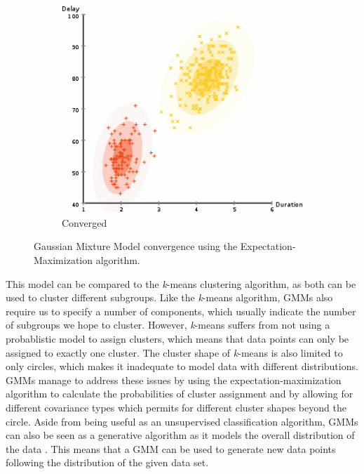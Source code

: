 \documentclass
[
    a4paper,
    twoside,
    12pt,
]
{report}
\begin{document}
\begin{figure}[ht!]
\begin{subfigure}[H]{0.3\textwidth}
         \label{fig:gmm-mid}
   \end{subfigure}
   \quad
   \begin{subfigure}[H]{0.3\textwidth}
      \includegraphics[width=\textwidth]{img/em-alg4.jpg}
         \caption{Converged}
         \label{fig:gmm-conv}
   \end{subfigure}
   \quad
   \caption{Gaussian Mixture Model convergence using the Expectation-Maximization algorithm.}\label{fig:em-converge}
\end{figure}

This model can be compared to the \emph{k}-means clustering algorithm,
as both can be used to cluster different subgroups. Like the
\emph{k}-means algorithm, GMMs also require us to specify a number of
components, which usually indicate the number of subgroups we hope to
cluster. However, \emph{k}-means suffers from not using a probablistic
model to assign clusters, which means that data points can only be
assigned to exactly one cluster. The cluster shape of \emph{k}-means is
also limited to only circles, which makes it inadequate to model data
with different distributions. GMMs manage to address these issues by
using the expectation-maximization algorithm to calculate the
probabilities of cluster assignment and by allowing for different
covariance types which permits for different cluster shapes beyond the
circle. Aside from being useful as an unsupervised classification
algorithm, GMMs can also be seen as a generative algorithm as it models
the overall distribution of the data \parencite{mcgonagle2016}. This
means that a GMM can be used to generate new data points following the
distribution of the given data set.
\end{document}

